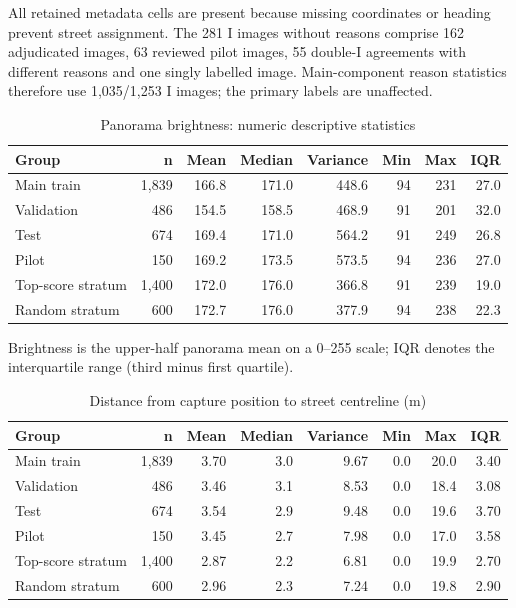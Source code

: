 All retained metadata cells are present because missing coordinates or heading prevent street assignment. The 281 I images without reasons comprise 162 adjudicated images, 63 reviewed pilot images, 55 double-I agreements with different reasons and one singly labelled image. Main-component reason statistics therefore use 1,035/1,253 I images; the primary labels are unaffected.

\begin{table}[H]\centering\caption{Panorama brightness: numeric descriptive statistics}\label{en:bright}
\begin{tabularx}{\textwidth}{L r r r r r r r}\toprule
Group & n & Mean & Median & Variance & Min & Max & IQR \\\midrule
Main train & 1,839 & 166.8 & 171.0 & 448.6 & 94 & 231 & 27.0 \\
Validation & 486 & 154.5 & 158.5 & 468.9 & 91 & 201 & 32.0 \\
Test & 674 & 169.4 & 171.0 & 564.2 & 91 & 249 & 26.8 \\
Pilot & 150 & 169.2 & 173.5 & 573.5 & 94 & 236 & 27.0 \\
Top-score stratum & 1,400 & 172.0 & 176.0 & 366.8 & 91 & 239 & 19.0 \\
Random stratum & 600 & 172.7 & 176.0 & 377.9 & 94 & 238 & 22.3 \\\bottomrule
\end{tabularx}\end{table}
Brightness is the upper-half panorama mean on a 0--255 scale; IQR denotes the interquartile range (third minus first quartile).
\begin{table}[H]\centering\caption{Distance from capture position to street centreline (m)}\label{en:dist}
\begin{tabularx}{\textwidth}{L r r r r r r r}\toprule
Group & n & Mean & Median & Variance & Min & Max & IQR \\\midrule
Main train & 1,839 & 3.70 & 3.0 & 9.67 & 0.0 & 20.0 & 3.40 \\
Validation & 486 & 3.46 & 3.1 & 8.53 & 0.0 & 18.4 & 3.08 \\
Test & 674 & 3.54 & 2.9 & 9.48 & 0.0 & 19.6 & 3.70 \\
Pilot & 150 & 3.45 & 2.7 & 7.98 & 0.0 & 17.0 & 3.58 \\
Top-score stratum & 1,400 & 2.87 & 2.2 & 6.81 & 0.0 & 19.9 & 2.70 \\
Random stratum & 600 & 2.96 & 2.3 & 7.24 & 0.0 & 19.8 & 2.90 \\\bottomrule
\end{tabularx}\end{table}
